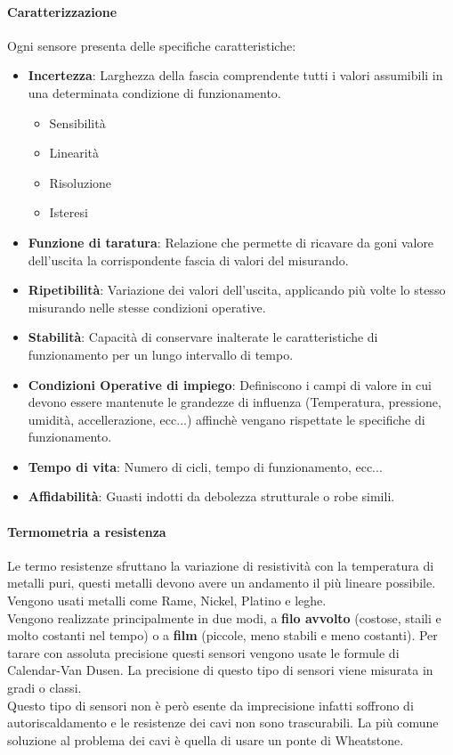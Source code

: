 \documentclass[12pt]{article}
\begin{document}
\paragraph{Caratterizzazione} Ogni sensore presenta delle specifiche caratteristiche:
\begin{itemize}
  \item \textbf{Incertezza}: Larghezza della fascia comprendente tutti i valori assumibili in una determinata condizione di funzionamento.
  \begin{itemize}
    \item Sensibilità
    \item Linearità
    \item Risoluzione
    \item Isteresi
  \end{itemize}
  \item \textbf{Funzione di taratura}: Relazione che permette di ricavare da goni valore dell'uscita la corrispondente fascia di valori del misurando.
  \item \textbf{Ripetibilità}: Variazione dei valori dell'uscita, applicando più volte lo stesso misurando nelle stesse condizioni operative.
  \item \textbf{Stabilità}: Capacità di conservare inalterate le caratteristiche di funzionamento per un lungo intervallo di tempo.
  \item \textbf{Condizioni Operative di impiego}: Definiscono i campi di valore in cui devono essere mantenute le grandezze di influenza (Temperatura, pressione, umidità, accellerazione, ecc...) affinchè vengano rispettate le specifiche di funzionamento.
  \item \textbf{Tempo di vita}: Numero di cicli, tempo di funzionamento, ecc...
  \item \textbf{Affidabilità}: Guasti indotti da debolezza strutturale o robe simili.
\end{itemize}

\paragraph{Termometria a resistenza} Le termo resistenze sfruttano la variazione di resistività con la temperatura di metalli puri, questi metalli devono avere un andamento il più lineare possibile. Vengono usati metalli come Rame, Nickel, Platino e leghe.\\
Vengono realizzate principalmente in due modi, a \textbf{filo avvolto} (costose, staili e molto costanti nel tempo) o a \textbf{film} (piccole, meno stabili e meno costanti). Per tarare con assoluta precisione questi sensori vengono usate le formule di Calendar-Van Dusen. La precisione di questo tipo di sensori viene misurata in gradi o classi.\\
Questo tipo di sensori non è però esente da imprecisione infatti soffrono di autoriscaldamento e le resistenze dei cavi non sono trascurabili. La più comune soluzione al problema dei cavi è quella di usare un ponte di Wheatstone.
\end{document}
